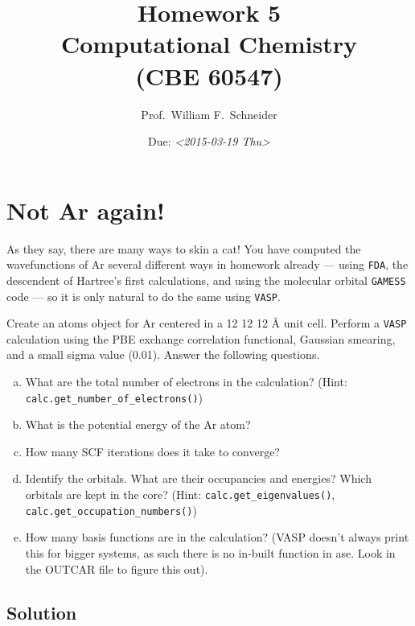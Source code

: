 \documentclass[11pt]{article}
\date{Due: \textit{<2015-03-19 Thu>}}
\title{}
\begin{document}
\title{Homework 5\\ Computational Chemistry \\(CBE 60547)}
\author{Prof.\ William F.\ Schneider}
\maketitle


\section{Not Ar again!}
\label{sec-1}

As they say, there are many ways to skin a cat! You have computed the wavefunctions of Ar several different ways in homework already — using \texttt{FDA}, the descendent of Hartree’s first calculations, and using the molecular orbital \texttt{GAMESS} code — so it is only natural to do the same using \texttt{VASP}. 

Create an atoms object for Ar centered in a 12 \texttimes{} 12 \texttimes{} 12 \AA{} unit cell. Perform a \texttt{VASP} calculation using the PBE exchange correlation functional, Gaussian smearing, and a small sigma value (0.01). Answer the following questions.

\begin{enumerate}[(a)]
\item What are the total number of electrons in the calculation? (Hint: \verb~calc.get_number_of_electrons()~)

\item What is the potential energy of the Ar atom?

\item How many SCF iterations does it take to converge?

\item Identify the orbitals. What are their occupancies and energies? Which orbitals are kept in the core? (Hint: \verb~calc.get_eigenvalues()~, \verb~calc.get_occupation_numbers()~)

\item How many basis functions are in the calculation? (VASP doesn't always print this for bigger systems, as such there is no in-built function in ase. Look in the OUTCAR file to figure this out).
\end{enumerate}

\subsection{Solution}
\label{sec-1-1}
\end{document}
